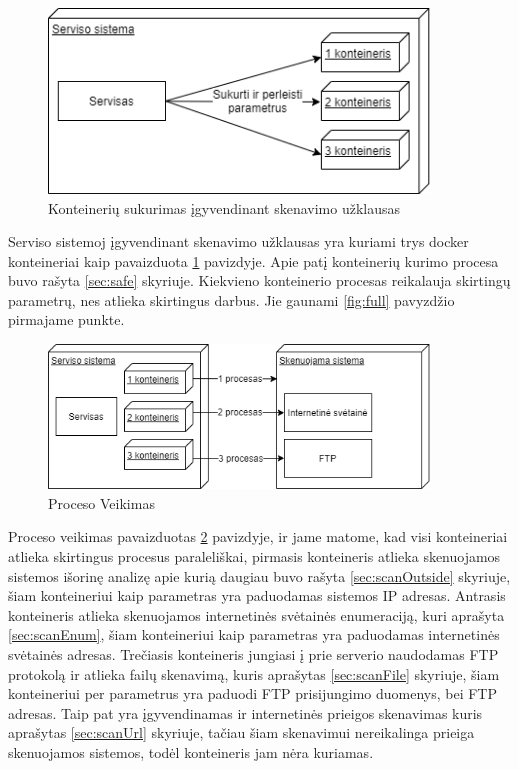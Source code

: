 \documentclass[a4paper,12pt,fleqn]{article}
\begin{document}
\begin{figure}[H]
	\centering
	\includegraphics[width=0.9\textwidth]{figs/1Containerlt.png}
	\caption{Konteinerių sukurimas įgyvendinant skenavimo užklausas}
	\label{fig:1Container}
\end{figure}

Serviso sistemoj įgyvendinant skenavimo užklausas yra kuriami trys docker konteineriai kaip pavaizduota \ref{fig:1Container} pavizdyje. Apie patį konteinerių kurimo procesa buvo rašyta \ref{sec:safe} skyriuje. Kiekvieno konteinerio procesas reikalauja skirtingų parametrų, nes atlieka skirtingus darbus. Jie gaunami \ref{fig:full} pavyzdžio pirmajame punkte.

\begin{figure}[H]
	\centering
	\includegraphics[width=0.9\textwidth]{figs/2Containerlt.png}
	\caption{Proceso Veikimas}
	\label{fig:2Container}
\end{figure}

Proceso veikimas pavaizduotas \ref{fig:2Container} pavizdyje, ir jame matome, kad visi konteineriai atlieka skirtingus procesus paraleliškai, pirmasis konteineris atlieka skenuojamos sistemos išorinę analizę apie kurią daugiau buvo rašyta \ref{sec:scanOutside} skyriuje, šiam konteineriui kaip parametras yra paduodamas sistemos IP adresas. Antrasis konteineris atlieka skenuojamos internetinės svėtainės enumeraciją, kuri aprašyta \ref{sec:scanEnum}, šiam konteineriui kaip parametras yra paduodamas internetinės svėtainės adresas. Trečiasis konteineris jungiasi į prie serverio naudodamas FTP protokolą ir atlieka failų skenavimą, kuris aprašytas \ref{sec:scanFile} skyriuje, šiam konteineriui per parametrus yra paduodi FTP prisijungimo duomenys, bei FTP adresas. Taip pat yra įgyvendinamas ir internetinės prieigos skenavimas kuris aprašytas \ref{sec:scanUrl} skyriuje, tačiau šiam skenavimui nereikalinga prieiga skenuojamos sistemos, todėl konteineris jam nėra kuriamas.
\end{document}
